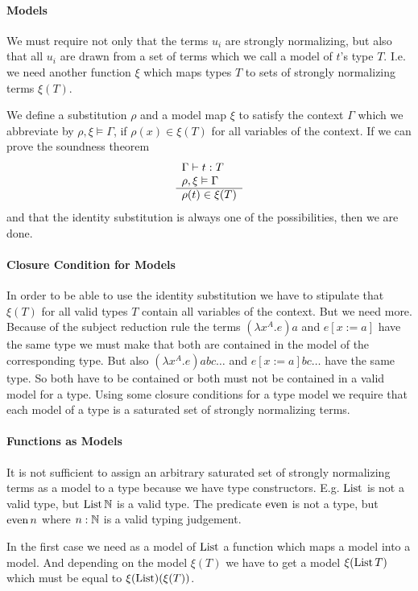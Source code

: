 \paragraph{Models}
We must require not only that the terms $u_i$ are strongly normalizing, but
also that all $u_i$ are drawn from a set of terms which we call a model of
$t$'s type $T$. I.e. we need another function $\xi$ which maps types $T$ to
sets of strongly normalizing terms $\xi(T)$.

We define a substitution $\rho$ and a model map $\xi$ to satisfy the context
$\Gamma$ which we abbreviate by $\rho,\xi \vDash \Gamma$, if $\rho(x) \in
\xi(T)$ for all variables of the context. If we can prove the soundness
theorem
$$
\begin{array}{l} 
  \Gamma \vdash t : T
  \\
  \rho,\xi \vDash \Gamma
 \\ \hline \rho(t) \in \xi(T)\end{array}
$$
and that the identity substitution is always one of the possibilities, then we
are done.

\paragraph{Closure Condition for  Models}
In order to be able to use the identity substitution we have to stipulate that
$\xi(T)$ for all valid types $T$ contain all variables of the context. But we
need more. Because of the subject reduction rule the terms $(\lambda x^A. e)
a$ and $e[x:=a]$ have the same type we must make that both are contained in
the model of the corresponding type. But also $(\lambda x^A.e) a b c \ldots$
and $e[x:=a] b c \ldots$ have the same type. So both have to be contained or
both must not be contained in a valid model for a type. Using some closure
conditions for a type model we require that each model of a type is a
saturated set of strongly normalizing terms.


\paragraph{Functions as Models}
It is not sufficient to assign an arbitrary saturated set of strongly
normalizing terms as a model to a type because we have type
constructors. E.g. $\text{List}$ is not a valid type, but $\text{List}\,\mathbb{N}$ is a valid
type. The predicate $\text{even}$ is not a type, but $\text{even}\,n$ where $n:\mathbb{N}$ is a
valid typing judgement.

In the first case we need as a model of $\text{List}$ a function which maps a model
into a model. And depending on the model $\xi(T)$ we have to get a model
$\xi(\text{List}\,T)$ which must be equal to $\xi(\text{List}) (\xi(T))$.

